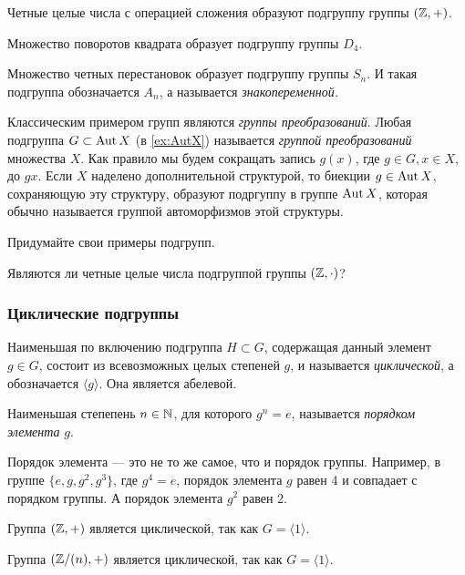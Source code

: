 \begin{example}
    Четные целые числа с операцией сложения образуют подгруппу группы $(\mathbb Z, +)$.
\end{example}
\begin{example}
    Множество поворотов квадрата образует подгруппу группы $D_4$.
\end{example}
\begin{example}
    Множество четных перестановок образует подгруппу группы $S_n$. 
    И такая подгруппа обозначается $A_n$, а называется \emph{знакопеременной.}
\end{example}
\begin{example}
    Классическим примером групп являются \emph{группы преобразований}. Любая подгруппа $G \subset \operatorname{Aut} X$ (в \cref{ex:AutX}) называется \emph{группой преобразований} множества $X$. Как правило мы будем сокращать запись $g(x)$, где $g \in G, x \in X$, до $gx$. Если $X$ наделено дополнительной структурой, то биекции $g \in \operatorname{Aut} X$, сохраняющую эту структуру, образуют подргуппу в группе $\operatorname{Aut} X$, которая обычно называется группой автоморфизмов этой структуры.
\end{example}
\begin{practice}
    Придумайте свои примеры подгрупп.
\end{practice}
\begin{practice}
    Являются ли четные целые числа подгруппой группы $(\mathbb Z, \cdot)$?
\end{practice}

\subsubsection{Циклические подгруппы}
\begin{definition}
    Наименьшая по включению подгруппа $H\subset G$, содержащая данный элемент $g \in G$, состоит из всевозможных целых степеней $g$, и называется \emph{циклической}, а обозначается $\langle g \rangle$. Она является абелевой.
    
    Наименьшая степепень $n \in \mathbb N$, для которого $g^n = e$, называется \emph{порядком элемента} $g$. 
\end{definition}
\begin{remark}
    Порядок элемента --- это не то же самое, что и порядок группы. Например, в группе $\{e, g, g^2, g^3\}$, где $g^4=e$, порядок элемента $g$ равен 4 и совпадает с порядком группы. А порядок элемента $g^2$ равен 2.
\end{remark}
\begin{example}
    Группа $(\mathbb Z, +)$ является циклической, так как $G = \langle 1 \rangle$.
\end{example}
\begin{example}
    Группа $(\mathbb Z/{(n)}, +)$ является циклической, так как $G = \langle 1 \rangle$.
\end{example}
